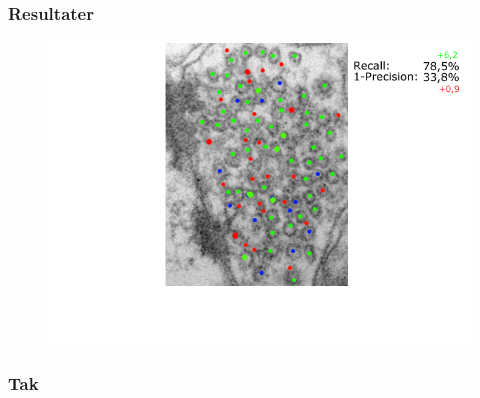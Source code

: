\documentclass[12pt,t]{beamer}
\begin{document}
\begin{frame}
\frametitle{Resultater}
\begin{figure}[H]
	\centering
	\includegraphics[scale=0.4]{img/afstand/res_5.png}
\end{figure}
\end{frame}

\begin{frame}
\frametitle{Tak}
\end{frame}
\end{document}
